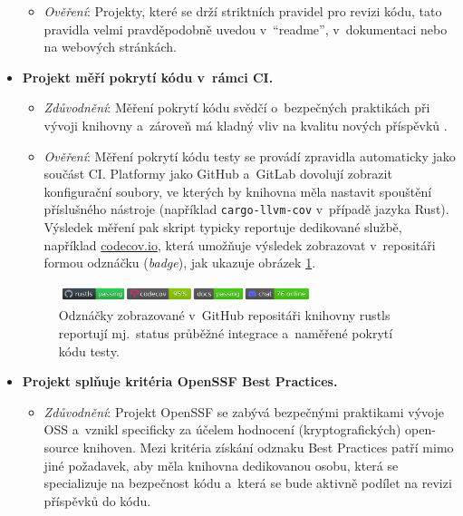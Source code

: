 \begin{itemize}
\begin{itemize}[beginpenalty=10000]
        \item \textit{Ověření}: Projekty, které se drží striktních pravidel pro revizi kódu, tato pravidla velmi pravděpodobně uvedou v~``readme'', v~dokumentaci nebo na webových stránkách.
    \end{itemize}

    \item \textbf{Projekt měří pokrytí kódu v~rámci CI.} 
    \begin{itemize}[beginpenalty=10000]
        \item \textit{Zdůvodnění}: Měření pokrytí kódu svědčí o~bezpečných praktikách při vývoji knihovny a~zároveň má kladný vliv na kvalitu nových příspěvků \cite{adding-sparkle}.

        \item \textit{Ověření}: Měření pokrytí kódu testy se provádí zpravidla automaticky jako součást CI. Platformy jako GitHub a~GitLab dovolují zobrazit konfigurační soubory, ve kterých by knihovna měla nastavit spouštění příslušného nástroje (například \texttt{cargo-llvm-cov} v~případě jazyka Rust). Výsledek měření pak skript typicky reportuje dedikované službě, například \url{codecov.io}, která umožňuje výsledek zobrazovat v~repositáři formou odznáčku (\textit{badge}), jak ukazuje obrázek \ref{fig:badges}.
    \end{itemize}

    \begin{figure}[!h]
        \centering
        \includegraphics[width=0.7\textwidth]{text/media/badges-hq.png}
        \caption[~Odznáčky knihovny rustls]{Odznáčky zobrazované v~GitHub repositáři knihovny rustls \cite{rustls-gh} reportují mj.~status průběžné integrace a~naměřené pokrytí kódu testy.}
        \label{fig:badges}
    \end{figure}

    \item \textbf{Projekt splňuje kritéria OpenSSF Best Practices.} 
    \begin{itemize}[beginpenalty=10000]
        \item \textit{Zdůvodnění}: Projekt OpenSSF se zabývá bezpečnými praktikami vývoje OSS a~vznikl specificky za účelem hodnocení (kryptografických) open-source knihoven. Mezi kritéria získání odznaku Best Practices patří mimo jiné požadavek, aby měla knihovna dedikovanou osobu, která se specializuje na bezpečnost kódu a~která se bude aktivně podílet na revizi příspěvků do kódu.


\end{itemize}
\end{itemize}
